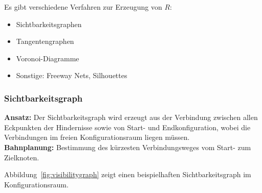 			Es gibt verschiedene Verfahren zur Erzeugung von \(R\):
			\begin{itemize}
				\item Sichtbarkeitsgraphen
				\item Tangentengraphen
				\item Voronoi-Diagramme
				\item Sonstige: Freeway Nets, Silhouettes
			\end{itemize}

			\subsubsection{Sichtbarkeitsgraph}
				\textbf{Ansatz:} Der Sichtbarkeitsgraph wird erzeugt aus der Verbindung zwischen allen Eckpunkten der Hindernisse sowie von Start- und Endkonfiguration, wobei die Verbindungen im freien Konfigurationsraum liegen müssen. \\
				\textbf{Bahnplanung:} Bestimmung des kürzesten Verbindungsweges vom Start- zum Zielknoten.

				Abbildung~\ref{fig:visibilitygraph} zeigt einen beispielhaften Sichtbarkeitsgraph im Konfigurationsraum.

